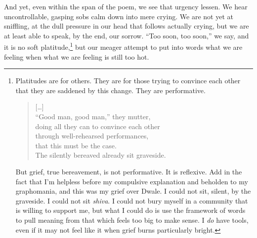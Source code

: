 \documentclass[12pt,oneside]{memoir}
\begin{document}
And yet, even within the span of the poem, we see that urgency lessen. We hear uncontrollable, gasping sobs calm down into mere crying. We are not yet at sniffling, at the dull pressure in our head that follows actually crying, but we are at least able to speak, by the end, our sorrow. ``Too soon, too soon,'' we say, and it is no soft platitude,\footnote{Platitudes are for others. They are for those trying to convince each other that they are saddened by this change. They are performative.
\begin{verse}
{[\ldots]} \\
``Good man, good man,'' they mutter, \\
doing all they can to convince each other \\
through well-rehearsed performances, \\
that this must be the case. \\
The silently bereaved already sit graveside.\par
\parencite{penguins}
\end{verse}\par
But grief, true bereavement, is not performative. It is reflexive. Add in the fact that I'm helpless before my compulsive explanation and beholden to my graphomania, and this was my grief over Dwale. I could not sit, silent, by the graveside. I could not sit \emph{shiva}. I could not bury myself in a community that is willing to support me, but what I could do is use the framework of words to pull meaning from that which feels too big to make sense. I \emph{do} have tools, even if it may not feel like it when grief burns particularly bright.} but our meager attempt to put into words what we are feeling when what we are feeling is still too hot.
\end{document}
